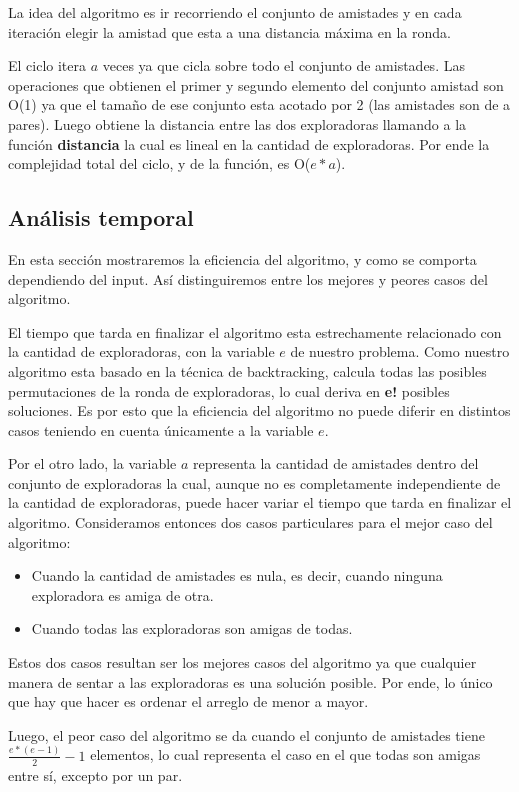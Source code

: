 \documentclass[11pt]{article}
\begin{document}
La idea del algoritmo es ir recorriendo el conjunto de amistades y en cada iteración elegir la amistad que esta 
a una distancia máxima en la ronda.

El ciclo itera $a$ veces ya que cicla sobre todo el conjunto de amistades. Las operaciones que obtienen el 
primer y segundo elemento del conjunto amistad son O(1) ya que el tamaño de ese conjunto esta acotado por 
2 (las amistades son de a pares). Luego obtiene la distancia entre las dos exploradoras llamando a la 
función \textbf{distancia} la cual es lineal en la cantidad de exploradoras. Por ende la complejidad
total del ciclo, y de la función, es O($e*a$). 

\subsection{Análisis temporal}

En esta sección mostraremos la eficiencia del algoritmo, y como se comporta dependiendo del input. Así distinguiremos 
entre los mejores y peores casos del algoritmo.

El tiempo que tarda en finalizar el algoritmo esta estrechamente relacionado con la cantidad de exploradoras, 
con la variable $e$ de nuestro problema. Como nuestro algoritmo esta basado en la técnica de backtracking, 
calcula todas las posibles permutaciones de la ronda de exploradoras, lo cual deriva en \textbf{e!} posibles soluciones.
Es por esto que la eficiencia del algoritmo no puede diferir en distintos casos teniendo en cuenta únicamente 
a la variable $e$.

Por el otro lado, la variable $a$ representa la cantidad de amistades dentro del conjunto de exploradoras la cual, 
aunque no es completamente independiente de la cantidad de exploradoras, puede hacer variar el tiempo que tarda 
en finalizar el algoritmo. Consideramos entonces dos casos particulares para el mejor caso del algoritmo:
\begin{itemize}
  \item Cuando la cantidad de amistades es nula, es decir, cuando ninguna exploradora es amiga de otra.
  \item Cuando todas las exploradoras son amigas de todas.
\end{itemize}
Estos dos casos resultan ser los mejores casos del algoritmo ya que cualquier manera de sentar a las exploradoras 
es una solución posible. Por ende, lo único que hay que hacer es ordenar el arreglo de menor a mayor. 

Luego, el peor caso del algoritmo se da cuando el conjunto de amistades tiene $\frac{e*(e-1)}{2} - 1$ elementos, 
lo cual representa el caso en el que todas son amigas entre sí, excepto por un par.
\end{document}
